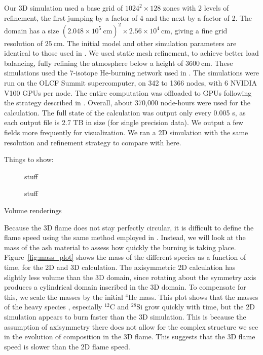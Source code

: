 \documentclass[twocolumn,times,tighten]{aastex631}
\newcommand{\isot}[2]{$^{#2}\mathrm{#1}$}
\begin{document}
Our 3D simulation used a base grid of $1024^2 \times 128$ zones with 2
levels of refinement, the first jumping by a factor of 4 and the next
by a factor of 2.  The domain has a size $(2.048\times
10^5~\mathrm{cm})^2 \times 2.56\times 10^4~\mathrm{cm}$, giving a fine
grid resolution of $25~\mathrm{cm}$.  The initial model and other
simulation parameters are identical to those used in
\citet{harpole:2021}.  We used static mesh refinement, to achieve
better load balancing, fully refining the atmosphere below a height of
$3600~\mathrm{cm}$.  These simulations used the 7-isotope He-burning
network used in \citet{eiden:2020}.  The simulations were run on the
OLCF Summit supercomputer, on 342 to 1366 nodes, with 6 NVIDIA V100
GPUs per node.  The entire computation was offloaded to GPUs following
the strategy described in \citet{castro_gpu}.  Overall, about 370,000
node-hours were used for the calculation.  The full state of the
calculation was output only every 0.005 s, as each output file is 2.7 TB
in size (for single precision data).  We output a few fields more
frequently for visualization.  We ran a 2D simulation with the same
resolution and refinement strategy to compare with here.

Things to show:

\begin{figure*}[t]
\centering
{}
\caption{\label{fig:2d_abar} stuff}
\end{figure*}

\begin{figure}[t]
\centering
\caption{\label{fig:vr_abar} stuff}
\end{figure}


Volume renderings

Because the 3D flame does not stay perfectly circular, it is difficult
to define the flame speed using the same method employed in
\citet{eiden:2020}.  Instead, we will look at the mass of the ash
material to assess how quickly the burning is taking place.
Figure~\ref{fig:mass_plot} shows the mass of the different species as
a function of time, for the 2D and 3D calculation.  The axisymmetric
2D calculation has slightly less volume than the 3D domain, since
rotating about the symmetry axis produces a cylindrical domain
inscribed in the 3D domain.  To compensate for this, we scale the
masses by the initial \isot{He}{4} mass.  This plot shows that the
masses of the heavy species , especially \isot{C}{12} and
\isot{Si}{28} grow quickly with time, but the 2D simulation appears to
burn faster than the 3D simulation.  This is because the assumption of
axisymmetry there does not allow for the complex structure we see in
the evolution of composition in the 3D flame.  This suggests that the
3D flame speed is slower than the 2D flame speed.
\end{document}
